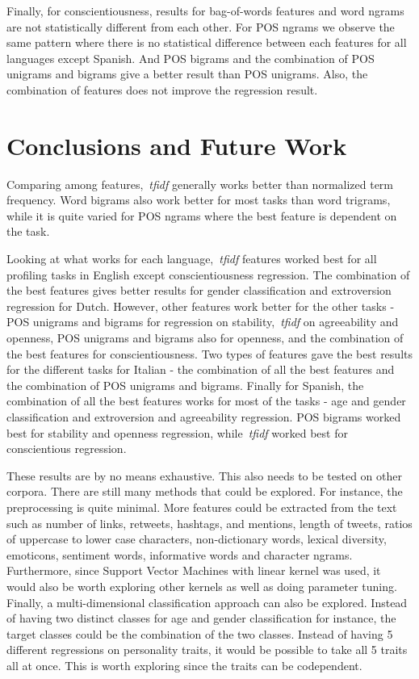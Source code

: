 \documentclass[a4paper]{llncs}
\begin{document}
Finally, for conscientiousness, results for bag-of-words features and word ngrams are not statistically different from each other. For POS ngrams we observe the same pattern where there is no statistical difference between each features for all languages except Spanish. And POS bigrams and the combination of POS unigrams and bigrams give a better result than POS unigrams. Also, the combination of features does not improve the regression result. 



\section{Conclusions and Future Work}
Comparing among features,~\textit{tfidf} generally works better than normalized term frequency. Word bigrams also work better for most tasks than word trigrams, while it is quite varied for POS ngrams where the best feature is dependent on the task. 

Looking at what works for each language,~\textit{tfidf} features worked best for all profiling tasks in English except conscientiousness regression. The combination of the best features gives better results for gender classification and extroversion regression for Dutch. However, other features work better for the other tasks - POS unigrams and bigrams for regression on stability,~\textit{tfidf} on agreeability and openness, POS unigrams and bigrams also for openness, and the combination of the best features for conscientiousness. Two types of features gave the best results for the different tasks for Italian - the combination of all the best features and the combination of POS unigrams and bigrams. Finally for Spanish, the combination of all the best features works for most of the tasks - age and gender classification and extroversion and agreeability regression. POS bigrams worked best for stability and openness regression, while~\textit{tfidf} worked best for conscientious regression.

These results are by no means exhaustive. This also needs to be tested on other corpora. There are still many methods that could be explored. For instance, the preprocessing is quite minimal. More features could be extracted from the text such as number of links, retweets, hashtags, and mentions, length of tweets, ratios of uppercase to lower case characters, non-dictionary words, lexical diversity, emoticons, sentiment words, informative words and character ngrams. Furthermore, since Support Vector Machines with linear kernel was used, it would also be worth exploring other kernels as well as doing parameter tuning. Finally, a multi-dimensional classification approach can also be explored. Instead of having two distinct classes for age and gender classification for instance, the target classes could be the combination of the two classes. Instead of having 5 different regressions on personality traits, it would be possible to take all 5 traits all at once. This is worth exploring since the traits can be codependent. 





\end{document}
